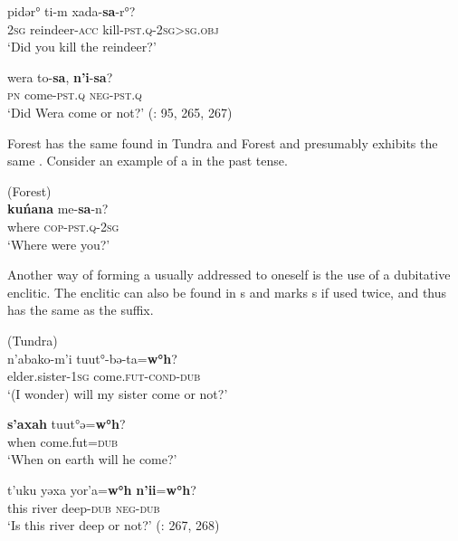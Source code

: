     \ex
    \gll pidər° ti-m xada-\textbf{{sa}}{-r°}?\\
    2\textsc{sg}  reindeer-\textsc{acc}  kill-\textsc{pst}.\textsc{q}-2\textsc{sg}>\textsc{sg}.\textsc{obj}\\
    \glt ‘Did you kill the reindeer?’
    
    \ex
    \gll wera to-\textbf{{sa}}, \textbf{{n}}\textbf{{’}}\textbf{{i}}{-}\textbf{{sa}}?\\
    \textsc{pn}  come-\textsc{pst}.\textsc{q}  \textsc{neg}-\textsc{pst}.\textsc{q}\\
    \glt ‘Did Wera come or not?’ (\citealt{Nikolaeva2014}: 95, 265, 267)\z\z

Forest  has the same  found in Tundra  and Forest  and presumably exhibits the same . Consider an example of a  in the past tense.

\newpage 
\ea%
    \label{ex:ural:8}
     (Forest)\\
    \gll \textbf{{kuńana}} me-\textbf{{sa}}{-n?}\\
    where    \textsc{cop}-\textsc{pst.q}-2\textsc{sg}\\
    \glt ‘Where were you?’ \citep[115]{Mikola2004}
    \z

Another way of forming a  usually addressed to oneself is the use of a dubitative enclitic. The enclitic can also be found in s and marks s if used twice, and thus has the same  as the suffix.

\ea%
    \label{ex:ural:9}
     (Tundra)\\
    \ea
    \gll n’{abako-m’}{i} tuu{t°-bə-ta=}\textbf{{w°h}}?\\
    elder.sister-1\textsc{sg}  come.\textsc{fut}-\textsc{cond}-\textsc{dub}\\
    \glt ‘(I wonder) will my sister come or not?’
    
    \ex
    \gll \textbf{{s’axah}} t{uut°ə}{=}\textbf{{w°h}}?\\
    when    come.fut=\textsc{dub}\\
    \glt ‘When on earth will he come?’
    
    \ex
    \gll t’{uku} yəxa yor’{a=}\textbf{{w°h}} \textbf{{n}}\textbf{{’ii}}{=}\textbf{{w°h}}?\\
    this  river  deep-\textsc{dub}  \textsc{neg}-\textsc{dub}\\
    \glt ‘Is this river deep or not?’ (\citealt{Nikolaeva2014}: 267, 268)\z\z

